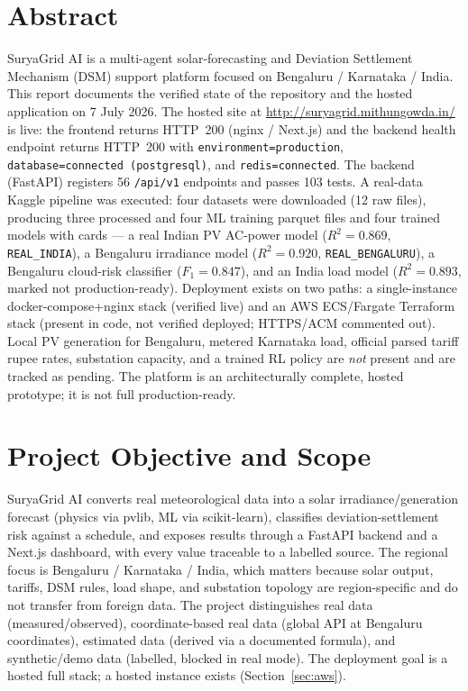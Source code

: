 \documentclass[11pt,a4paper]{article}
\newcommand{\code}[1]{\texttt{\small #1}}
\begin{document}
\section{Abstract}
SuryaGrid AI is a multi-agent solar-forecasting and Deviation Settlement Mechanism (DSM)
support platform focused on Bengaluru / Karnataka / India. This report documents the
verified state of the repository and the hosted application on 7 July 2026. The hosted
site at \url{http://suryagrid.mithungowda.in/} is live: the frontend returns HTTP~200
(nginx / Next.js) and the backend health endpoint returns HTTP~200 with
\code{environment=production}, \code{database=connected (postgresql)}, and
\code{redis=connected}. The backend (FastAPI) registers 56 \code{/api/v1} endpoints and
passes 103 tests. A real-data Kaggle pipeline was executed: four datasets were downloaded
(12 raw files), producing three processed and four ML training parquet files and four
trained models with cards --- a real Indian PV AC-power model
($R^2=0.869$, \code{REAL\_INDIA}), a Bengaluru irradiance model ($R^2=0.920$,
\code{REAL\_BENGALURU}), a Bengaluru cloud-risk classifier ($F_1=0.847$), and an India
load model ($R^2=0.893$, marked not production-ready). Deployment exists on two paths: a
single-instance docker-compose+nginx stack (verified live) and an AWS ECS/Fargate
Terraform stack (present in code, not verified deployed; HTTPS/ACM commented out). Local
PV generation for Bengaluru, metered Karnataka load, official parsed tariff rupee rates,
substation capacity, and a trained RL policy are \emph{not} present and are tracked as
pending. The platform is an architecturally complete, hosted prototype; it is not full
production-ready.

\section{Project Objective and Scope}
SuryaGrid AI converts real meteorological data into a solar irradiance/generation forecast
(physics via pvlib, ML via scikit-learn), classifies deviation-settlement risk against a
schedule, and exposes results through a FastAPI backend and a Next.js dashboard, with every
value traceable to a labelled source. The regional focus is Bengaluru / Karnataka / India,
which matters because solar output, tariffs, DSM rules, load shape, and substation topology
are region-specific and do not transfer from foreign data. The project distinguishes real
data (measured/observed), coordinate-based real data (global API at Bengaluru
coordinates), estimated data (derived via a documented formula), and synthetic/demo data
(labelled, blocked in real mode). The deployment goal is a hosted full stack; a hosted
instance exists (Section~\ref{sec:aws}).
\end{document}
